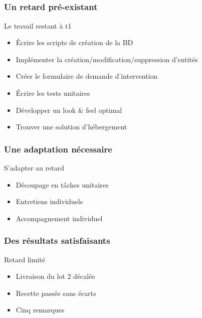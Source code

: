 \speaker{\Pierre{}}
\subsection{} %

\begin{frame}
\frametitle{Un retard pré-existant}
\begin{block}{Le travail restant à t1}
\begin{itemize}
	\item Écrire les scripts de création de la BD
	\item Implémenter la création/modification/suppression d'entités
	\item Créer le formulaire de demande d'intervention
	\item Écrire les tests unitaires
	\item Développer un look \& feel optimal
	\item Trouver une solution d’hébergement
\end{itemize}
\end{block}
\end{frame}


\begin{frame}
\frametitle{Une adaptation nécessaire}
\begin{block}{S'adapter au retard}
\begin{itemize}
	\item Découpage en tâches unitaires
	\item Entretiens individuels
	\item Accompagnement individuel
\end{itemize}
\end{block}
\end{frame}


\begin{frame}
\frametitle{Des résultats satisfaisants}
\begin{block}{Retard limité}
\begin{itemize}
	\item Livraison du lot 2 décalée
	\item Recette passée sans écarts
	\item Cinq remarques
\end{itemize}
\end{block}
\end{frame}


